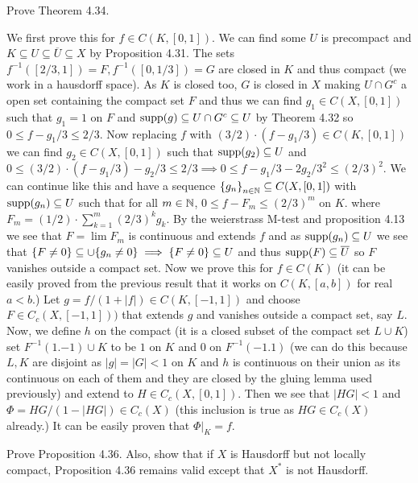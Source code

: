 \documentclass[12pt,a4paper]{article}
\begin{document}
\begin{problem}\label{prob:4-46}
Prove Theorem 4.34.
\end{problem}
\begin{solution}
    We first prove this for $f\in C(K,[0,1])$. 
    We can find some $U$ is precompact and $K \subseteq U \subseteq \overline{U} \subseteq X$ by Proposition 4.31. 
    The sets $f^{-1}([2/3,1])=F,f^{-1}([0,1/3])=G$ are closed in $K$ and thus compact (we work in a hausdorff space). 
    As $K$ is closed too, $G$ is closed in $X$ making $U\cap G^c$ a open set containing the compact set  $F$ and thus we can find $g_1\in C(X,[0,1])$ such that $g_1=1$ on $F$ and $\operatorname{supp}(g) \subseteq U\cap G^c \subseteq U$ by Theorem 4.32 so $0\leq f-g_1/3\leq 2/3$. 
    Now replacing $f$ with $(3/2)\cdot(f-g_1/3)\in C(K,[0,1])$ we can find $g_2\in C(X,[0,1])$ such that $\operatorname{supp}(g_2) \subseteq U$ and $0\leq (3/2)\cdot(f-g_1/3)-g_2/3\leq 2/3\implies 0\leq f-g_1/3-2g_2/3^2\leq (2/3)^2$. 
    We can continue like this and have a sequence $ \qty{g_n}_{n\in\mathbb{N}} \subseteq C(X,[0,1])$ with $\operatorname{supp}(g_n) \subseteq U$ such that for all $m\in\mathbb{N}$, $0\leq f-F_m\leq (2/3)^m$ on $K.$ where $F_m=(1/2)\cdot\sum_{k=1}^m (2/3)^kg_k$. 
    By the weierstrass M-test and proposition 4.13 we see that $F=\lim F_m$ is continuous and extends $f$ and as $\operatorname{supp}(g_n) \subseteq U$ we see that $ \qty{F\neq 0} \subseteq\cup \qty{g_n\neq 0}\implies \qty{F\neq 0} \subseteq U$ and thus $\operatorname{supp}(F) \subseteq \overline{U}$ so $F$ vanishes outside a compact set.  
    Now we prove this for $f\in C(K)$ (it can be easily proved from the previous result that it works on $C(K,[a,b])$ for real $a<b$.)  
    Let $g=f/(1+|f|)\in C(K,[-1,1])$ and choose $F\in C_c(X,[-1,1]))$ that extends $g$ and vanishes outside a compact set, say $L$. 
    Now, we define $h$ on the compact (it is a closed subset of the compact set $L\cup K$) set $F^{-1}( \qty{1,-1})\cup K$ to be $1$ on $K$ and $0$ on $F^{-1}( \qty{-1,1})$ (we can do this because $L,K$ are disjoint as $|g|=|G|<1$ on $K$ and $h$ is continuous on their union as its continuous on each of them and they are closed by the gluing lemma used previously) and extend to $H\in C_c(X,[0,1]).$ 
    Then we see that $|HG|<1$ and $\Phi=HG/(1-|HG|)\in C_c(X)$ (this inclusion is true as $HG\in C_c(X)$ already.) 
    It can be easily proven that $\Phi|_K=f.$
\end{solution}
\begin{problem}\label{prob:4-47}
Prove Proposition 4.36. Also, show that if $X$ is Hausdorff but not locally compact, Proposition 4.36 remains valid except that $X^*$ is not Hausdorff.
\end{problem}
\end{document}

